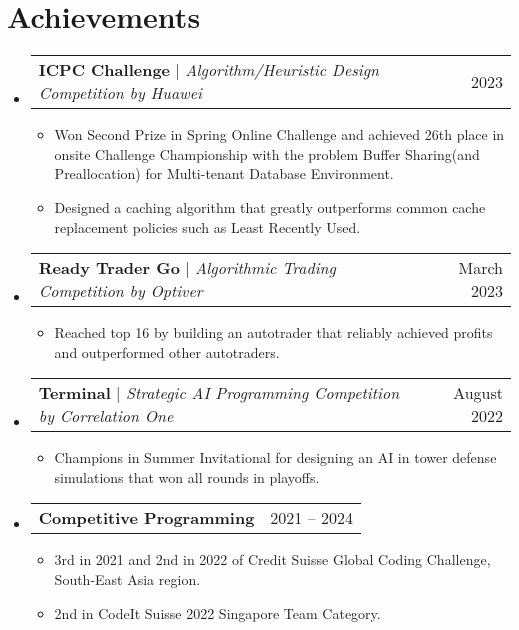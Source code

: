 \documentclass[letterpaper,11pt]{article}
\makeatletter
\newcommand{\resumeItem}[1]{
  \item\footnotesize{
    {#1 \vspace{-2pt}}
  }
}
\newcommand{\resumeProjectHeading}[2]{
    \item
    \begin{tabular*}{0.97\textwidth}{l@{\extracolsep{\fill}}r}
      \small#1 & #2 \\
    \end{tabular*}\vspace{-6pt}
}
\newcommand{\resumeSubHeadingListStart}{\begin{itemize}[leftmargin=0.15in, label={}]}
\newcommand{\resumeSubHeadingListEnd}{\end{itemize}}
\newcommand{\resumeItemListStart}{\begin{itemize}}
\newcommand{\resumeItemListEnd}{\end{itemize}\vspace{-7pt}}
\makeatother
\begin{document}
\section{Achievements}
    \resumeSubHeadingListStart
      \resumeProjectHeading
          {\textbf{ICPC Challenge} $|$ \emph{Algorithm/Heuristic Design Competition by Huawei}}{2023}
          \resumeItemListStart
            \resumeItem{Won Second Prize in Spring Online Challenge and achieved 26th place in onsite Challenge Championship with the problem Buffer Sharing(and Preallocation) for Multi-tenant Database Environment. }
            \resumeItem{Designed a caching algorithm that greatly outperforms common cache replacement policies such as Least Recently Used. }
          \resumeItemListEnd
      \resumeProjectHeading
          {\textbf{Ready Trader Go} $|$ \emph{Algorithmic Trading Competition by Optiver}}{March 2023}
          \resumeItemListStart
            \resumeItem{Reached top 16 by building an autotrader that reliably achieved profits and outperformed other autotraders.}
          \resumeItemListEnd
      \resumeProjectHeading
          {\textbf{Terminal} $|$ \emph{Strategic AI Programming Competition by Correlation One}}{August 2022}
          \resumeItemListStart
            \resumeItem{Champions in Summer Invitational for designing an AI in tower defense simulations that won all rounds in playoffs.}
          \resumeItemListEnd
      \resumeProjectHeading
          {\textbf{Competitive Programming} \emph{}}{2021 -- 2024}
          \resumeItemListStart
            \resumeItem{3rd in 2021 and 2nd in 2022 of Credit Suisse Global Coding Challenge, South-East Asia region.}
            \resumeItem{2nd in CodeIt Suisse 2022 Singapore Team Category.}
          \resumeItemListEnd
    \resumeSubHeadingListEnd

\end{document}
